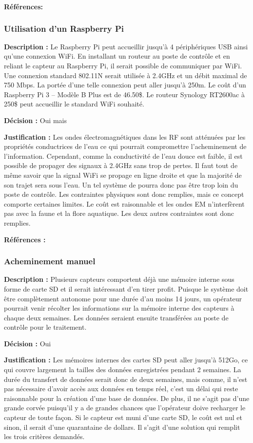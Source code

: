 \textbf{Références:} \cite{usb_50m} \cite{usb_standard_50m} \cite{Techflex}

\subsubsection{Utilisation d'un Raspberry Pi}
\textbf{Description :} Le Raspberry Pi peut accueillir jusqu'à 4 périphériques USB ainsi qu'une connexion WiFi. En installant un routeur au poste de contrôle et en reliant le capteur au Raspberry Pi, il serait possible de communiquer par WiFi. Une connexion standard 802.11N serait utilisée à 2.4GHz et un débit maximal de 750 Mbps. La portée d'une telle connexion peut aller jusqu'à 250m. Le coût d'un Raspberry Pi 3 – Modèle B Plus est de 46.50\$. Le routeur Synology RT2600ac à 250\$ peut accueillir le standard WiFi souhaité.

\textbf{Décision :} Oui mais
 
\textbf{Justification :} Les ondes électromagnétiques dans les RF sont atténuées par les propriétés conductrices de l'eau ce qui pourrait compromettre l'acheminement de l'information. Cependant, comme la conductivité de l'eau douce est faible, il est possible de propager des signaux à 2.4GHz sans trop de pertes. Il faut tout de même savoir que la signal WiFi se propage en ligne droite et que la majorité de son trajet sera sous l'eau. Un tel système de pourra donc pas être trop loin du poste de contrôle. Les contraintes physiques sont donc remplies, mais ce concept comporte certaines limites. Le coût est raisonnable et les ondes EM n'interfèrent pas avec la faune et la flore aquatique. Les deux autres contraintes sont donc remplies. 

\textbf{Références :} \cite{Raspberry_Pi} \cite{Routeur} \cite{eau_EM}

\subsubsection{Acheminement manuel}
\textbf{Description :} Plusieurs capteurs comportent déjà une mémoire interne sous forme de carte SD et il serait intéressant d'en tirer profit. Puisque le système doit être complètement autonome pour une durée d'au moins 14 jours, un opérateur pourrait venir récolter les informations sur la mémoire interne des capteurs à chaque deux semaines. Les données seraient ensuite transférées au poste de contrôle pour le traitement.
 
\textbf{Décision :} Oui
 
\textbf{Justification :} Les mémoires internes des cartes SD peut aller jusqu'à 512Go, ce qui couvre largement la tailles des données enregistrées pendant 2 semaines. La durée du transfert de données serait donc de deux semaines, mais comme, il n'est pas nécessaire d'avoir accès aux données en temps réel, c'est un délai qui reste raisonnable pour la création d'une base de données. De plus, il ne s'agit pas d'une grande corvée puisqu'il y a de grandes chances que l'opérateur doive recharger le capteur de toute façon. Si le capteur est muni d'une carte SD, le coût est nul et sinon, il serait d'une quarantaine de dollars. Il s'agit d'une solution qui remplit les trois critères demandés.

